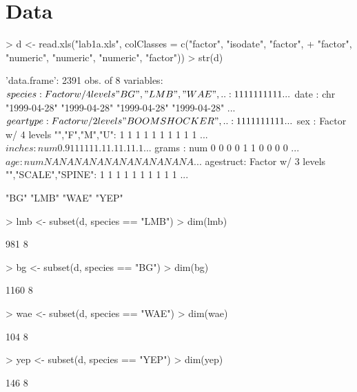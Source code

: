 \documentclass[a4paper]{article}
\begin{document}
\section{Data}
\begin{Schunk}
\begin{Sinput}
> d <- read.xls("lab1a.xls", colClasses = c("factor", "isodate", "factor",
+     "factor", "numeric", "numeric", "numeric", "factor"))
> str(d)
\end{Sinput}
\begin{Soutput}
'data.frame':	2391 obs. of  8 variables:
 $ species  : Factor w/ 4 levels "BG","LMB","WAE",..: 1 1 1 1 1 1 1 1 1 1 ...
 $ date     : chr  "1999-04-28" "1999-04-28" "1999-04-28" "1999-04-28" ...
 $ geartype : Factor w/ 2 levels "BOOM SHOCKER",..: 1 1 1 1 1 1 1 1 1 1 ...
 $ sex      : Factor w/ 4 levels "","F","M","U": 1 1 1 1 1 1 1 1 1 1 ...
 $ inches   : num  0.9 1 1 1 1 1 1.1 1.1 1.1 1.1 ...
 $ grams    : num  0 0 0 0 1 1 0 0 0 0 ...
 $ age      : num  NA NA NA NA NA NA NA NA NA NA ...
 $ agestruct: Factor w/ 3 levels "","SCALE","SPINE": 1 1 1 1 1 1 1 1 1 1 ...
\end{Soutput}
\begin{Soutput}
[1] "BG"  "LMB" "WAE" "YEP"
\end{Soutput}
\begin{Sinput}
> lmb <- subset(d, species == "LMB")
> dim(lmb)
\end{Sinput}
\begin{Soutput}
[1] 981   8
\end{Soutput}
\begin{Sinput}
> bg <- subset(d, species == "BG")
> dim(bg)
\end{Sinput}
\begin{Soutput}
[1] 1160    8
\end{Soutput}
\begin{Sinput}
> wae <- subset(d, species == "WAE")
> dim(wae)
\end{Sinput}
\begin{Soutput}
[1] 104   8
\end{Soutput}
\begin{Sinput}
> yep <- subset(d, species == "YEP")
> dim(yep)
\end{Sinput}
\begin{Soutput}
[1] 146   8
\end{Soutput}
\end{Schunk}
\end{document}
